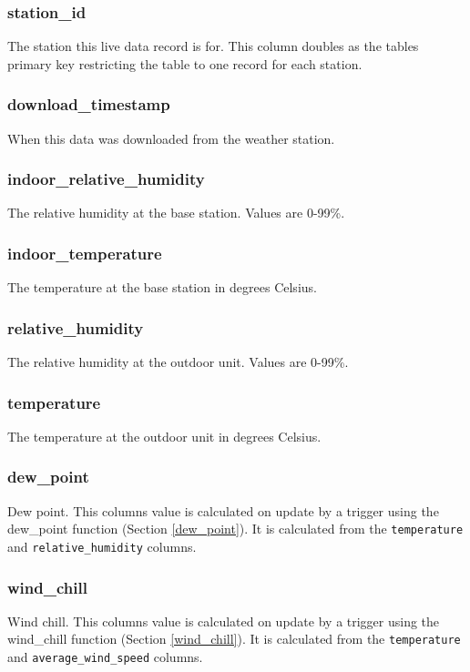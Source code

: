 \documentclass[a4paper,10pt]{book}
\begin{document}
\subsubsection{station\_id}
The station this live data record is for. This column doubles as the tables primary key restricting the table to one record for each station.

\subsubsection{download\_timestamp}
When this data was downloaded from the weather station.

\subsubsection{indoor\_relative\_humidity}
The relative humidity at the base station. Values are 0-99\%. 

\subsubsection{indoor\_temperature}
The temperature at the base station in degrees Celsius. 

\subsubsection{relative\_humidity}
The relative humidity at the outdoor unit. Values are 0-99\%.

\subsubsection{temperature}
The temperature at the outdoor unit in degrees Celsius.

\subsubsection{dew\_point}
Dew point. This columns value is calculated on update by a trigger using the dew\_point function (Section \ref{dew_point}). It is calculated from the \verb|temperature| and \verb|relative_humidity| columns.

\subsubsection{wind\_chill}
Wind chill. This columns value is calculated on update by a trigger using the wind\_chill function (Section \ref{wind_chill}). It is calculated from the \verb|temperature| and \verb|average_wind_speed| columns.
\end{document}
